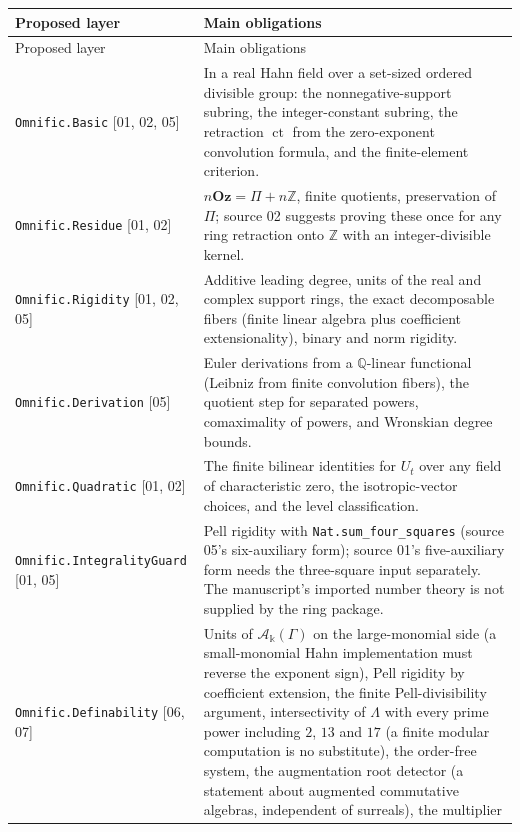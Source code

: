 \documentclass[11pt,oneside]{article}
\numberwithin{equation}{section}
\theoremstyle{definition}
\theoremstyle{remark}
\newcommand{\Oz}{\mathbf{Oz}}
\newcommand{\Z}{\mathbb Z}
\newcommand{\Q}{\mathbb Q}
\newcommand{\ct}{\operatorname{ct}}
\newcommand{\src}[1]{\textup{\textsf{\small[#1]}}}
\newcommand{\fn}[1]{\nolinkurl{#1}}
\begin{document}
\addtocounter{table}{-1}
\begingroup
\renewcommand{\arraystretch}{1.2}
\begin{longtable}{>{\raggedright\arraybackslash}p{}>{\raggedright\arraybackslash}p{}}
\toprule
Proposed layer & Main obligations\\
\midrule
\endfirsthead
\toprule
Proposed layer & Main obligations\\
\midrule
\endhead
\bottomrule
\endfoot
\fn{Omnific.Basic} \src{01, 02, 05} & In a real Hahn field over a
set-sized ordered divisible group: the nonnegative-support subring, the
integer-constant subring, the retraction $\ct$ from the zero-exponent
convolution formula, and the finite-element criterion.\\
\fn{Omnific.Residue} \src{01, 02} & $n\Oz=\Pi+n\Z$, finite quotients,
preservation of $\Pi$; source 02 suggests proving these once for any ring
retraction onto $\Z$ with an integer-divisible kernel.\\
\fn{Omnific.Rigidity} \src{01, 02, 05} & Additive leading degree, units of
the real and complex support rings, the exact decomposable fibers (finite
linear algebra plus coefficient extensionality), binary and norm rigidity.\\
\fn{Omnific.Derivation} \src{05} & Euler derivations from a $\Q$-linear
functional (Leibniz from finite convolution fibers), the quotient step
for separated powers, comaximality of powers, and Wronskian degree bounds.\\
\fn{Omnific.Quadratic} \src{01, 02} & The finite bilinear identities for
$U_t$ over any field of characteristic zero, the isotropic-vector choices,
and the level classification.\\
\fn{Omnific.IntegralityGuard} \src{01, 05} & Pell rigidity with
\fn{Nat.sum_four_squares} (source 05's six-auxiliary form); source 01's
five-auxiliary form needs the three-square input separately. The
manuscript's imported number theory is not supplied by the ring package.\\
\fn{Omnific.Definability} \src{06, 07} & Units of $\mathcal A_\Bbbk(\Gamma)$
on the large-monomial side (a small-monomial Hahn implementation must reverse
the exponent sign), Pell rigidity by coefficient extension, the finite
Pell-divisibility argument, intersectivity of $\Lambda$ with every prime power
including $2$, $13$ and $17$ (a finite modular computation is no substitute),
the order-free system, the augmentation root detector (a statement about
augmented commutative algebras, independent of surreals), the multiplier

\end{longtable}
\end{document}
